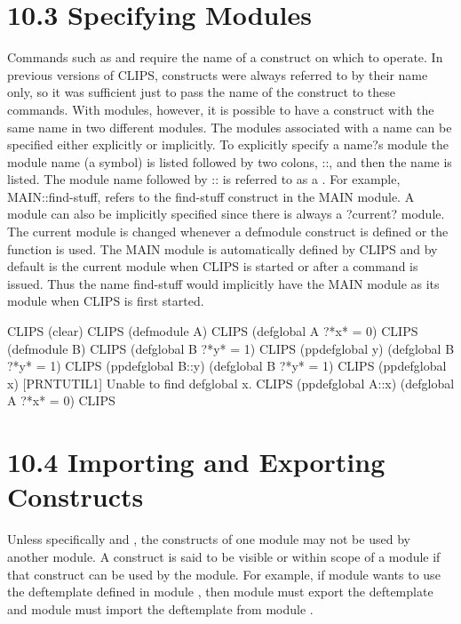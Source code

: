 \documentclass[letterpaper,10pt,english]{sphinxmanual}
\begin{document}
\section{10.3 Specifying Modules}
\label{\detokenize{defmodule:specifying-modules}}
Commands such as  and  require the name of a
construct on which to operate. In previous versions of CLIPS, constructs
were always referred to by their name only, so it was sufficient just to
pass the name of the construct to these commands. With modules, however,
it is possible to have a construct with the same name in two different
modules. The modules associated with a name can be specified either
explicitly or implicitly. To explicitly specify a name?s module the
module name (a symbol) is listed followed by two colons, ::, and then
the name is listed. The module name followed by :: is referred to as a
. For example, MAIN::find-stuff, refers to the
find-stuff construct in the MAIN module. A module can also be implicitly
specified since there is always a ?current? module. The current module
is changed whenever a defmodule construct is defined or the
 function is used. The MAIN module is
automatically defined by CLIPS and by default is the current module when
CLIPS is started or after a  command is issued. Thus the name
find-stuff would implicitly have the MAIN module as its module when
CLIPS is first started.

\begin{sphinxVerbatim}[commandchars=\\\{\}]
CLIPS\PYGZgt{} (clear)
CLIPS\PYGZgt{} (defmodule A)
CLIPS\PYGZgt{} (defglobal A ?*x* = 0)
CLIPS\PYGZgt{} (defmodule B)
CLIPS\PYGZgt{} (defglobal B ?*y* = 1)
CLIPS\PYGZgt{} (ppdefglobal y)
(defglobal B ?*y* = 1)
CLIPS\PYGZgt{} (ppdefglobal B::y)
(defglobal B ?*y* = 1)
CLIPS\PYGZgt{} (ppdefglobal x)
[PRNTUTIL1] Unable to find defglobal x.
CLIPS\PYGZgt{} (ppdefglobal A::x)
(defglobal A ?*x* = 0)
CLIPS\PYGZgt{}
\end{sphinxVerbatim}


\section{10.4 Importing and Exporting Constructs}
\label{\detokenize{defmodule:importing-and-exporting-constructs}}
Unless specifically  and , the constructs of one
module may not be used by another module. A construct is said to be
visible or within scope of a module if that construct can be used by the
module. For example, if module  wants to use the  deftemplate
defined in module , then module  must export the  deftemplate
and module  must import the  deftemplate from module .
\end{document}
